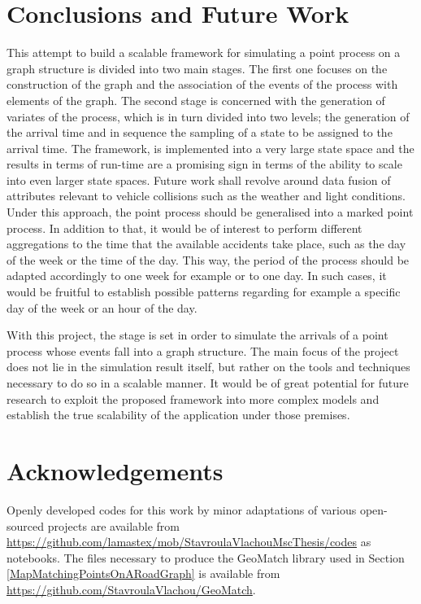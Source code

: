 \documentclass[12pt]{article}
\theoremstyle{definition}
\begin{document}
\section{Conclusions and Future Work}
This attempt to build a scalable framework for simulating a point process on a graph structure is divided into two main stages. The first one focuses on the construction of the graph and the association of the events of the process with elements of the graph. The second stage is concerned with the generation of variates of the process, which is in turn divided into two levels; the generation of the arrival time and in sequence the sampling of a state to be assigned to the arrival time. The framework, is implemented into a very large state space and the results in terms of run-time are a promising sign in terms of the ability to scale into even larger state spaces. 
Future work shall revolve around data fusion of attributes relevant to vehicle collisions such as the weather and light conditions. Under this approach, the point process should be generalised into a marked point process. In addition to that, it would be of interest to perform different aggregations to the time that the available accidents take place, such as the day of the week or the time of the day. This way, the period of the process should be adapted accordingly to one week for example or to one day. In such cases, it would be fruitful to establish possible patterns regarding for example a specific day of the week or an hour of the day. 

With this project, the stage is set in order to simulate the arrivals of a point process whose events fall into a graph structure. The main focus of the project does not lie in the simulation result itself, but rather on the tools and techniques necessary to do so in a scalable manner. It would be of great potential for future research to exploit the proposed framework into more complex models and establish the true scalability of the application under those premises. 

\section{Acknowledgements}
Openly developed codes for this work by minor adaptations of various open-sourced projects are available from \url{https://github.com/lamastex/mob/StavroulaVlachouMscThesis/codes} as notebooks. 
The files necessary to produce the GeoMatch library used in Section \ref{MapMatchingPointsOnARoadGraph} is available from \url{https://github.com/StavroulaVlachou/GeoMatch}.
\end{document}
